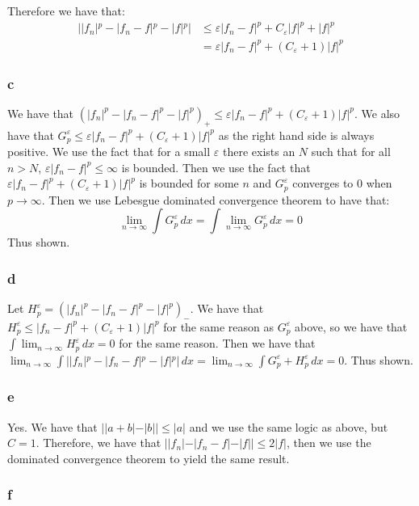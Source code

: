\documentclass{article}
\theoremstyle{definition}
\numberwithin{theorem}{section}
\numberwithin{equation}{section}
\begin{document}
Therefore we have that:
\begin{align*}
	| |f_n|^p - |f_n - f|^p - |f|^p | &\leq  \varepsilon |f_n - f|^p + C_\varepsilon |f|^p + |f|^p \\
	&=  \varepsilon |f_n - f|^p +( C_\varepsilon + 1) |f|^p
\end{align*}

\subsubsection*{c}
 We have that $(|f_n|^p - |f_n - f|^p - |f|^p)_+ \leq \varepsilon |f_n - f|^p +( C_\varepsilon + 1) |f|^p$. We also have that $G^\varepsilon_p \leq \varepsilon |f_n - f|^p +( C_\varepsilon + 1) |f|^p$ as the right hand side is always positive. We use the fact that for a small $\varepsilon$ there exists an $N$ such that for all $n > N$, $\varepsilon |f_n - f|^p \leq \infty$ is bounded.
 Then we use the fact that $\varepsilon |f_n - f|^p +( C_\varepsilon + 1) |f|^p$ is bounded for some $n$ and $G^\varepsilon_p$ converges to $0$ when $p \rightarrow \infty$. Then we use Lebesgue dominated convergence theorem to have that:
 \begin{equation}
 	\lim_{n \rightarrow \infty} \int  G^\varepsilon_p \, dx = \int \lim_{n \rightarrow \infty} G^\varepsilon_p \, dx = 0
 \end{equation}
 Thus shown. 
\subsubsection*{d}
Let $H^\varepsilon_p = (|f_n|^p - |f_n - f|^p - |f|^p)_-$. We have that $H^\varepsilon_p \leq |f_n - f|^p +( C_\varepsilon + 1) |f|^p$ for the same reason as $G^\varepsilon_p$ above, so we have that $\int \lim_{n \rightarrow \infty} H^\varepsilon_p \, dx = 0$ for the same reason. Then we have that $\lim_{n \rightarrow \infty}\int | |f_n|^p - |f_n - f|^p - |f|^p | \, dx = \lim_{n \rightarrow \infty} \int G^\varepsilon_p + H^\varepsilon_p \, dx = 0$. Thus shown.
\subsubsection*{e}
Yes. We have that $| |a + b| - |b|| \leq |a|$ and we use the same logic as above, but $C = 1$. Therefore, we have that $||f_n| - |f_n - f| - |f|| \leq 2 |f|$, then we use the dominated convergence theorem to yield the same result.
\subsubsection*{f}
\end{document}

